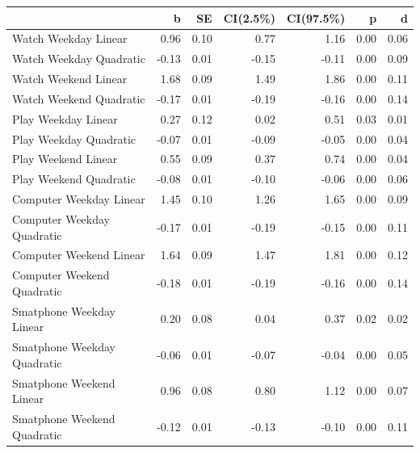 \documentclass[man]{apa6}
\theoremstyle{definition}
\theoremstyle{definition}
\theoremstyle{definition}
\theoremstyle{remark}
\begin{document}
\begin{tabular}{l|r|r|r|r|r|r}
\hline
  & b & SE & CI(2.5\%) & CI(97.5\%) & p & d\\
\hline
Watch Weekday Linear & 0.96 & 0.10 & 0.77 & 1.16 & 0.00 & 0.06\\
\hline
Watch Weekday Quadratic & -0.13 & 0.01 & -0.15 & -0.11 & 0.00 & 0.09\\
\hline
Watch Weekend Linear & 1.68 & 0.09 & 1.49 & 1.86 & 0.00 & 0.11\\
\hline
Watch Weekend Quadratic & -0.17 & 0.01 & -0.19 & -0.16 & 0.00 & 0.14\\
\hline
Play Weekday Linear & 0.27 & 0.12 & 0.02 & 0.51 & 0.03 & 0.01\\
\hline
Play Weekday Quadratic & -0.07 & 0.01 & -0.09 & -0.05 & 0.00 & 0.04\\
\hline
Play Weekend Linear & 0.55 & 0.09 & 0.37 & 0.74 & 0.00 & 0.04\\
\hline
Play Weekend Quadratic & -0.08 & 0.01 & -0.10 & -0.06 & 0.00 & 0.06\\
\hline
Computer Weekday Linear & 1.45 & 0.10 & 1.26 & 1.65 & 0.00 & 0.09\\
\hline
Computer Weekday Quadratic & -0.17 & 0.01 & -0.19 & -0.15 & 0.00 & 0.11\\
\hline
Computer Weekend Linear & 1.64 & 0.09 & 1.47 & 1.81 & 0.00 & 0.12\\
\hline
Computer Weekend Quadratic & -0.18 & 0.01 & -0.19 & -0.16 & 0.00 & 0.14\\
\hline
Smatphone Weekday Linear & 0.20 & 0.08 & 0.04 & 0.37 & 0.02 & 0.02\\
\hline
Smatphone Weekday Quadratic & -0.06 & 0.01 & -0.07 & -0.04 & 0.00 & 0.05\\
\hline
Smatphone Weekend Linear & 0.96 & 0.08 & 0.80 & 1.12 & 0.00 & 0.07\\
\hline
Smatphone Weekend Quadratic & -0.12 & 0.01 & -0.13 & -0.10 & 0.00 & 0.11\\
\hline
\end{tabular}
\end{document}
